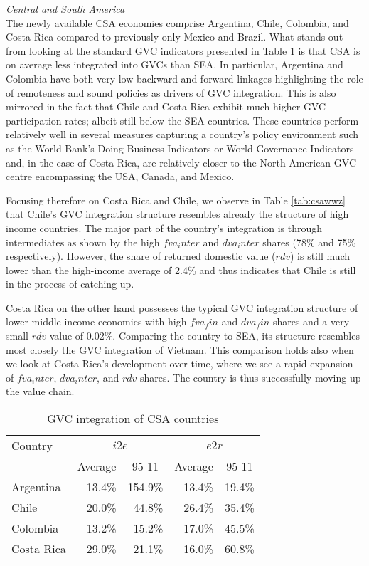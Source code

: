 \documentclass[11pt,a4paper]{article}
\begin{document}
\textit{Central and South America}\\
The newly available CSA economies comprise Argentina, Chile, Colombia, and Costa Rica compared to previously only Mexico and Brazil. What stands out from looking at the standard GVC indicators presented in Table \ref{tab:csagvc} is that CSA is on average less integrated into GVCs than SEA. In particular, Argentina and Colombia have both very low backward and forward linkages highlighting the role of remoteness and sound policies as drivers of GVC integration. This is also mirrored in the fact that Chile and Costa Rica exhibit much higher GVC participation rates; albeit still below the SEA countries. These countries perform relatively well in several measures capturing a country's policy environment such as the World Bank's Doing Business Indicators or World Governance Indicators and, in the case of Costa Rica, are relatively closer to the North American GVC centre encompassing the USA, Canada, and Mexico. 

Focusing therefore on Costa Rica and Chile, we observe in Table \ref{tab:csawwz} that Chile's GVC integration structure resembles already the structure of high income countries. The major part of the country's integration is through intermediates as shown by the high $fva_inter$ and $dva_inter$ shares (78\% and 75\% respectively). However, the share of returned domestic value ($rdv$) is still much lower than the high-income average of 2.4\% and thus indicates that Chile is still in the process of catching up.

Costa Rica on the other hand possesses the typical GVC integration structure of lower middle-income economies with high $fva_fin$ and $dva_fin$ shares and a very small $rdv$ value of 0.02\%. Comparing the country to SEA, its structure resembles most closely the GVC integration of Vietnam. This comparison holds also when we look at Costa Rica's development over time, where we see a rapid expansion of $fva_inter$, $dva_inter$, and $rdv$ shares. The country is thus successfully moving up the value chain.

\begin{table}[htbp]\small
  \centering
  \caption{GVC integration of CSA countries}
    \begin{tabular}{lrrrr}
    \toprule
    Country & \multicolumn{2}{c}{\multirow{1}[0]{*}{$i2e$}} & \multicolumn{2}{c}{\multirow{1}[0]{*}{$e2r$}} \\
    \multicolumn{1}{c}{} & \multicolumn{1}{c}{Average} & \multicolumn{1}{c}{95-11} & \multicolumn{1}{c}{Average} & \multicolumn{1}{c}{95-11} \\
    \midrule
    Argentina & 13.4\% & 154.9\% & 13.4\% & 19.4\% \\
    Chile & 20.0\% & 44.8\% & 26.4\% & 35.4\% \\
    Colombia & 13.2\% & 15.2\% & 17.0\% & 45.5\% \\
    Costa Rica & 29.0\% & 21.1\% & 16.0\% & 60.8\% \\
    \bottomrule
\end{tabular}
  \label{tab:csagvc}
\end{table}
\end{document}
